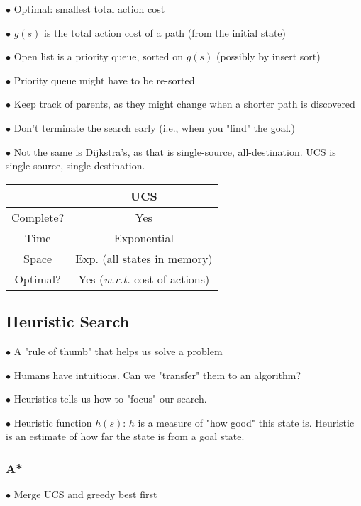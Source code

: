 \documentclass[english,openany]{book}
\begin{document}
    $\bullet$ Optimal: smallest total action cost
    
    $\bullet$ $g(s)$ is the total action cost of a path (from the initial state)
    
    $\bullet$ Open list is a priority queue, sorted on $g(s)$ (possibly by insert sort)
    
    $\bullet$ Priority queue might have to be re-sorted
    
    $\bullet$ Keep track of parents, as they might change when  a shorter path is discovered
    
    $\bullet$ Don't terminate the search early (i.e., when you "find" the goal.)
    
    $\bullet$ Not the same is Dijkstra's, as that is single-source, all-destination. UCS is single-source, single-destination.\\
    
    \begin{tabular}{|c|c|}
        \hline
        & UCS  \\
        \hline
        Complete? & Yes \\
        Time & Exponential\\
        Space & Exp. (all states in memory)\\
        Optimal? & Yes (\textit{w.r.t.} cost of actions)\\
        \hline
    \end{tabular}
    
    \subsection{Heuristic Search}
    
    $\bullet$ A "rule of thumb" that helps us solve a problem
    
    $\bullet$ Humans have intuitions. Can we "transfer" them to an algorithm?
    
    $\bullet$ Heuristics tells us how to "focus" our search.
    
    $\bullet$ Heuristic function $h(s)$: $h$ is a measure of "how good" this state is. Heuristic is an estimate of how far the state is from a goal state.
    
    \subsubsection{A*}
    
    $\bullet$ Merge UCS and greedy best first
    
\end{document}
